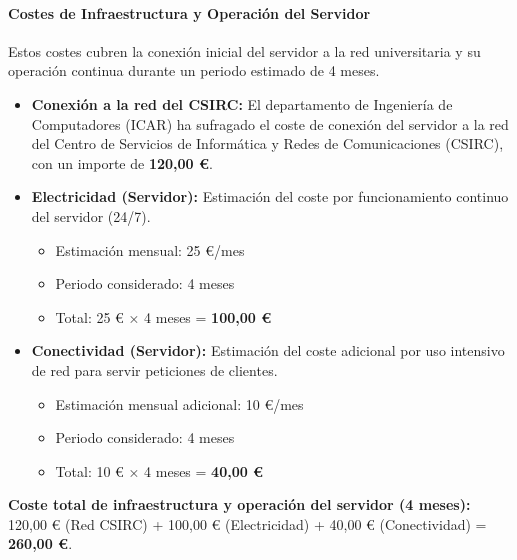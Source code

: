 \paragraph{Costes de Infraestructura y Operación del Servidor}
Estos costes cubren la conexión inicial del servidor a la red universitaria y su operación continua durante un periodo estimado de 4 meses.
\begin{itemize}
    \item \textbf{Conexión a la red del CSIRC:} El departamento de Ingeniería de Computadores (ICAR) ha sufragado el coste de conexión del servidor a la red del Centro de Servicios de Informática y Redes de Comunicaciones (CSIRC), con un importe de \textbf{120,00 €}.
    \item \textbf{Electricidad (Servidor):} Estimación del coste por funcionamiento continuo del servidor (24/7).
    \begin{itemize}
        \item Estimación mensual: 25 €/mes
        \item Periodo considerado: 4 meses
        \item Total: 25 € × 4 meses = \textbf{100,00 €}
    \end{itemize}
    \item \textbf{Conectividad (Servidor):} Estimación del coste adicional por uso intensivo de red para servir peticiones de clientes.
    \begin{itemize}
        \item Estimación mensual adicional: 10 €/mes
        \item Periodo considerado: 4 meses
        \item Total: 10 € × 4 meses = \textbf{40,00 €}
    \end{itemize}
\end{itemize}
\textbf{Coste total de infraestructura y operación del servidor (4 meses):} 120,00 € (Red CSIRC) + 100,00 € (Electricidad) + 40,00 € (Conectividad) = \textbf{260,00 €}.
